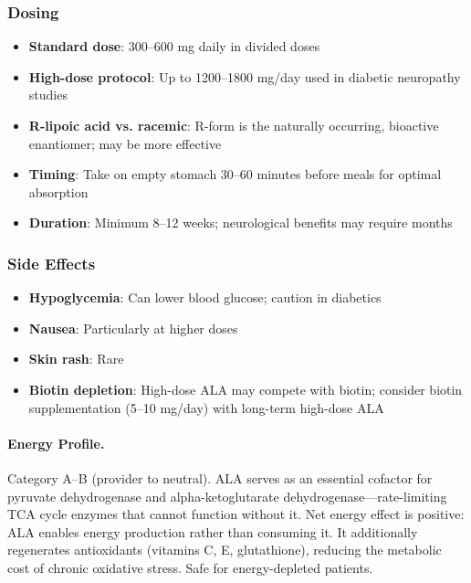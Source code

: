 \subsubsection{Dosing}

\begin{itemize}
    \item \textbf{Standard dose}: 300--600 mg daily in divided doses
    \item \textbf{High-dose protocol}: Up to 1200--1800 mg/day used in diabetic neuropathy studies
    \item \textbf{R-lipoic acid vs. racemic}: R-form is the naturally occurring, bioactive enantiomer; may be more effective
    \item \textbf{Timing}: Take on empty stomach 30--60 minutes before meals for optimal absorption
    \item \textbf{Duration}: Minimum 8--12 weeks; neurological benefits may require months
\end{itemize}

\subsubsection{Side Effects}

\begin{itemize}
    \item \textbf{Hypoglycemia}: Can lower blood glucose; caution in diabetics
    \item \textbf{Nausea}: Particularly at higher doses
    \item \textbf{Skin rash}: Rare
    \item \textbf{Biotin depletion}: High-dose ALA may compete with biotin; consider biotin supplementation (5--10 mg/day) with long-term high-dose ALA
\end{itemize}

\paragraph{Energy Profile.}
Category A--B (provider to neutral). ALA serves as an essential cofactor for pyruvate dehydrogenase and alpha-ketoglutarate dehydrogenase---rate-limiting TCA cycle enzymes that cannot function without it. Net energy effect is positive: ALA enables energy production rather than consuming it. It additionally regenerates antioxidants (vitamins C, E, glutathione), reducing the metabolic cost of chronic oxidative stress. Safe for energy-depleted patients.

